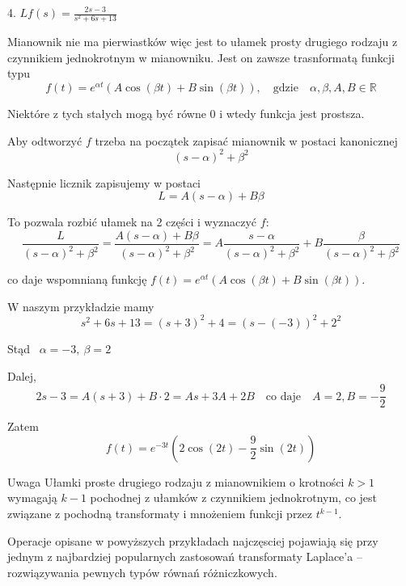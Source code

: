\begin{przykladbig}
    4. $ Lf(s) = \frac{2s - 3}{s^2 + 6s + 13} $

    Mianownik nie ma pierwiastków więc jest to ułamek prosty drugiego rodzaju z czynnikiem jednokrotnym w mianowniku. Jest on zawsze trasnformatą funkcji typu
    \[ f(t) = e^{\alpha t} (A \cos (\beta t) + B \sin (\beta t)), \quad \text{gdzie} \quad \alpha, \beta, A, B \in \mathbb{R} \]

    Niektóre z tych stałych mogą być równe 0 i wtedy funkcja jest prostsza.

    Aby odtworzyć $f$ trzeba na początek zapisać mianownik w postaci kanonicznej
    \[ (s - \alpha)^2 + \beta^2 \]

    Następnie licznik zapisujemy w postaci
    \[ L = A(s - \alpha) + B \beta \]
    
    To pozwala rozbić ułamek na 2 części i wyznaczyć $f$:
    \[ \frac{L}{(s - \alpha)^2 + \beta^2} = \frac{A(s - \alpha) + B \beta}{(s - \alpha)^2 + \beta^2} = A \frac{s - \alpha}{(s - \alpha)^2 + \beta^2} + B \frac{\beta}{(s - \alpha)^2 + \beta^2} \]

    co daje wspomnianą funkcję $ f(t) = e^{\alpha t} (A \cos (\beta t) + B \sin (\beta t)) $.
    
    W naszym przykładzie mamy 
    \[ s^2 + 6s + 13 = (s+3)^2 + 4 = (s - (-3))^2 + 2^2 \]
    
    Stąd \ $ \alpha = -3, \ \beta = 2 $

    Dalej,
    \[ 2s - 3 = A(s + 3) + B \cdot 2 = As + 3A + 2B \quad \text{co daje} \quad A = 2, B = -\frac{9}{2} \]
    
    Zatem 
    \[ f(t) = e^{-3t}\left( 2 \cos(2t) - \frac{9}{2} \sin(2t) \right) \]
\end{przykladbig}

\begin{blad}{Uwaga}
    Ułamki proste drugiego rodzaju z mianownikiem o krotności $k > 1$ wymagają $ k - 1 $ pochodnej z ułamków z czynnikiem jednokrotnym, co jest
    związane z pochodną transformaty i mnożeniem funkcji przez $ t^{k -1}$.
\end{blad}

Operacje opisane w powyższych przykładach najczęsciej pojawiają się przy jednym z najbardziej popularnych zastosowań transformaty Laplace'a -- rozwiązywania pewnych typów równań różniczkowych.